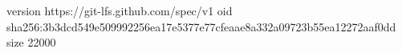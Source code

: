 version https://git-lfs.github.com/spec/v1
oid sha256:3b3dcd549e509992256ea17e5377e77cfeaae8a332a09723b55ea12272aaf0dd
size 22000
